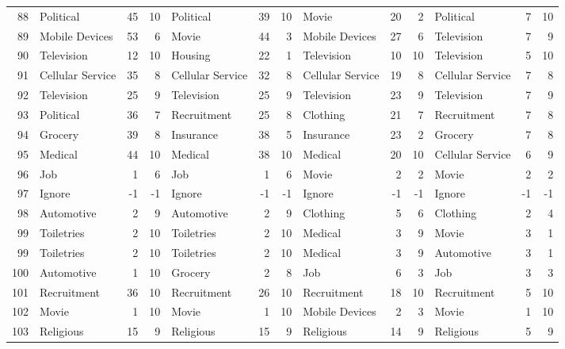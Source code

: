 \begin{figure}[htbp]
\begin{tabular}{rlrrlrrlrrlrr}
    88    & Political & 45    & 10    & Political & 39    & 10    & Movie & 20    & 2     & Political & 7     & 10 \\
    89    & Mobile Devices & 53    & 6     & Movie & 44    & 3     & Mobile Devices & 27    & 6     & Television & 7     & 9 \\
    90    & Television & 12    & 10    & Housing & 22    & 1     & Television & 10    & 10    & Television & 5     & 10 \\
    91    & Cellular Service & 35    & 8     & Cellular Service & 32    & 8     & Cellular Service & 19    & 8     & Cellular Service & 7     & 8 \\
    92    & Television & 25    & 9     & Television & 25    & 9     & Television & 23    & 9     & Television & 7     & 9 \\
    93    & Political & 36    & 7     & Recruitment & 25    & 8     & Clothing & 21    & 7     & Recruitment & 7     & 8 \\
    94    & Grocery & 39    & 8     & Insurance & 38    & 5     & Insurance & 23    & 2     & Grocery & 7     & 8 \\
    95    & Medical & 44    & 10    & Medical & 38    & 10    & Medical & 20    & 10    & Cellular Service & 6     & 9 \\
    96    & Job   & 1     & 6     & Job   & 1     & 6     & Movie & 2     & 2     & Movie & 2     & 2 \\
    97    & Ignore & -1    & -1    & Ignore & -1    & -1    & Ignore & -1    & -1    & Ignore & -1    & -1 \\
    98    & Automotive & 2     & 9     & Automotive & 2     & 9     & Clothing & 5     & 6     & Clothing & 2     & 4 \\
    99    & Toiletries & 2     & 10    & Toiletries & 2     & 10    & Medical & 3     & 9     & Movie & 3     & 1 \\
    99    & Toiletries & 2     & 10    & Toiletries & 2     & 10    & Medical & 3     & 9     & Automotive & 3     & 1 \\
    100   & Automotive & 1     & 10    & Grocery & 2     & 8     & Job   & 6     & 3     & Job   & 3     & 3 \\
    101   & Recruitment & 36    & 10    & Recruitment & 26    & 10    & Recruitment & 18    & 10    & Recruitment & 5     & 10 \\
    102   & Movie & 1     & 10    & Movie & 1     & 10    & Mobile Devices & 2     & 3     & Movie & 1     & 10 \\
    103   & Religious & 15    & 9     & Religious & 15    & 9     & Religious & 14    & 9     & Religious & 5     & 9 \\

\end{tabular}
\end{figure}
